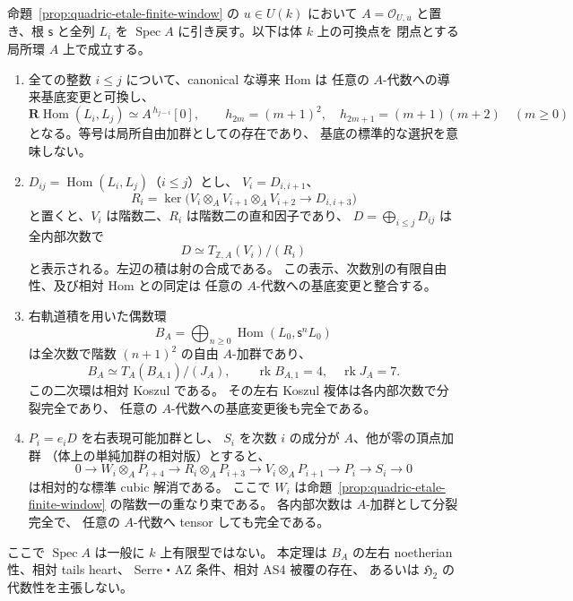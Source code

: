 \begin{theorem}
\label{thm:quadric-local-all-degree-cubic}
命題~\ref{prop:quadric-etale-finite-window} の $u\in U(k)$ において
$A=\mathcal O_{U,u}$ と置き、根 $\mathsf s$ と全列 $L_i$ を
$\operatorname{Spec}A$ に引き戻す。以下は体 $k$ 上の可換点を
閉点とする局所環 $A$ 上で成立する。
\begin{enumerate}
\item 全ての整数 $i\le j$ について、canonical な導来 Hom は
  任意の $A$-代数への導来基底変更と可換し、
  \[
    \mathbf R\operatorname{Hom}(L_i,L_j)
       \simeq A^{\,h_{j-i}}[0],\qquad
    h_{2m}=(m+1)^2,\quad
    h_{2m+1}=(m+1)(m+2)\quad(m\ge0)
  \]
  となる。等号は局所自由加群としての存在であり、
  基底の標準的な選択を意味しない。
\item $D_{ij}=\operatorname{Hom}(L_i,L_j)$（$i\le j$）とし、
  $V_i=D_{i,i+1}$、
  \[
    R_i=\ker\bigl(
      V_i\otimes_A V_{i+1}\otimes_A V_{i+2}
             \longrightarrow D_{i,i+3}\bigr)
  \]
  と置くと、$V_i$ は階数二、$R_i$ は階数二の直和因子であり、
  $D=\bigoplus_{i\le j}D_{ij}$ は全内部次数で
  \[
     D \simeq T_{\mathbb Z,A}(V_i)/(R_i)
     \tag{Loc-cub}\label{eq:quadric-local-cubic-presentation}
  \]
  と表示される。左辺の積は射の合成である。
  この表示、次数別の有限自由性、及び相対 Hom との同定は
  任意の $A$-代数への基底変更と整合する。
\item 右軌道積を用いた偶数環
  \[
    B_A=\bigoplus_{n\ge0}\operatorname{Hom}
                (L_0,\mathsf s^nL_0)
  \]
  は全次数で階数 $(n+1)^2$ の自由 $A$-加群であり、
  \[
      B_A\simeq T_A(B_{A,1})/(J_A),\qquad
      \operatorname{rk}B_{A,1}=4,\quad
      \operatorname{rk}J_A=7.
  \]
  この二次環は相対 Koszul である。
  その左右 Koszul 複体は各内部次数で分裂完全であり、
  任意の $A$-代数への基底変更後も完全である。
\item $P_i=e_iD$ を右表現可能加群とし、
  $S_i$ を次数 $i$ の成分が $A$、他が零の頂点加群
  （体上の単純加群の相対版）とすると、
  \[
  0\longrightarrow W_i\otimes_A P_{i+4}
   \longrightarrow R_i\otimes_A P_{i+3}
   \longrightarrow V_i\otimes_A P_{i+1}
   \longrightarrow P_i\longrightarrow S_i\longrightarrow0
  \tag{Loc-res}\label{eq:quadric-local-cubic-resolution}
  \]
  は相対的な標準 cubic 解消である。
  ここで $W_i$ は命題~\ref{prop:quadric-etale-finite-window}
  の階数一の重なり束である。
  各内部次数は $A$-加群として分裂完全で、
  任意の $A$-代数へ tensor しても完全である。
\end{enumerate}
ここで $\operatorname{Spec}A$ は一般に $k$ 上有限型ではない。
本定理は $B_A$ の左右 noetherian 性、相対 tails heart、
Serre・AZ 条件、相対 AS4 被覆の存在、
あるいは $\mathfrak H_2$ の代数性を主張しない。
\end{theorem}
